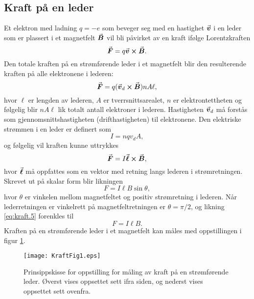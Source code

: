 \documentclass[../Elmag-labhefte-2020.tex]{subfiles}
\begin{document}
\subsection{Kraft på en leder \label{ch.kraft.beregn1} }
Et elektron med ladning $q = -e$ som beveger seg med en hastighet $\va*{v}$ i en leder som er plassert i et magnetfelt $\va*{B}$ vil bli påvirket av en kraft ifølge Lorentzkraften 
\begin{equation}
    \va*{F} = q \va*{v} \cross \va*{B}.
\end{equation}
%
 Den totale kraften på en strømførende leder i et magnetfelt blir den resulterende kraften på alle elektronene i lederen:
\begin{equation}
    \va*{F} = q (\va*{v}_d \cross \va*{B} ) n A \ell,
\end{equation}
%
hvor $\ell$ er lengden av lederen, $A$ er tverrsnittsarealet, $n$ er elektrontettheten og følgelig blir $n A \ell$ lik totalt antall elektroner i lederen. Hastigheten $\va*{v}_d$ må forstås som gjennomsnittshastigheten (drifthastigheten) til elektronene. 
Den elektriske strømmen i en leder er definert som 
\begin{equation}
    I = nqv_d A ,
\end{equation}
og følgelig vil kraften kunne uttrykkes
\begin{equation}
    \va*{F} = I\va*{\ell} \cross \va*{B},
\end{equation}
%
hvor $\va*{\ell}$  må oppfattes som en vektor med retning langs lederen i strømretningen. Skrevet ut på skalar form blir likningen
\begin{equation}
    F = I\ell B \sin \theta,
    \label{eq:kraft.5}
\end{equation}
hvor $\theta$ er vinkelen mellom magnetfeltet og positiv strømretning i lederen. Når lederretningen er vinkelrett på magnetfeltretningen er $\theta = \pi/2$, og likning \eqref{eq:kraft.5} forenkles til 
\begin{equation}
    F = I\ell B.
    \label{eq:kraft.6}
\end{equation}
%
Kraften på en strømførende leder i et magnetfelt kan måles med oppstillingen i figur \ref{kraft.fig1}.
\begin{figure}[tbh]
    \centering
    \texttt{[image: KraftFig1.eps]}
    \caption{%
        Prinsippskisse for oppstilling for måling av kraft på en strømførende leder. Øverst vises oppsettet sett ifra siden, og nederst vises oppsettet sett ovenfra.
    }
    \label{kraft.fig1}
\end{figure}
\end{document}
